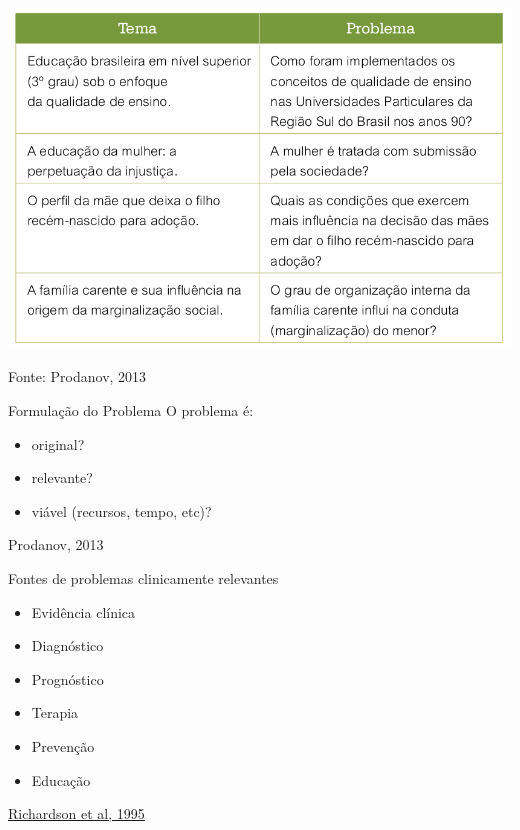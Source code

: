 \documentclass{beamer}
\begin{document}
\begin{frame}
  \begin{center}
  \includegraphics[height=0.8\textheight]{Hipoteses_variaveis/tema_problema}
\end{center}

  \vfill
  \scriptsize
  \hfill Fonte: Prodanov, 2013
\end{frame}

\begin{frame}{Formulação do Problema}
O problema é:
  \begin{itemize}
    \footnotesize
  \item original?
    \bigskip
  \item relevante?
    \bigskip
  \item viável (recursos, tempo, etc)?
  \end{itemize}

  \vfill
  \scriptsize
  \hfill Prodanov, 2013
\end{frame}

\begin{frame}{Fontes de problemas clinicamente relevantes}
  \begin{itemize}
    \footnotesize
  \item Evidência clínica
    \medskip
  \item Diagnóstico
    \medskip
  \item Prognóstico
    \medskip
  \item Terapia
    \medskip
  \item Prevenção
    \medskip
  \item Educação
  \end{itemize}

  \vfill
  \scriptsize
  \hfill \href{https://acpjc.acponline.org/Content/123/3/issue/ACPJC-1995-123-3-A12.htm}
      {Richardson et al, 1995}
\end{frame}
\end{document}
